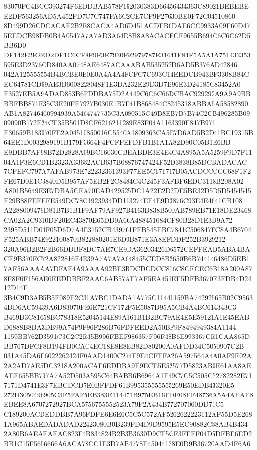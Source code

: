 \documentclass[UTF8,fontset=fandol,zihao=-4,a4paper]{ctexart}
\begin{document}
{{83070FC4BCC393274F6EDDBAB578F162030383D66456434363C89021BEBEBEE2DF563256AD5A452FD7C7C747FA6C2CE7CF9F27630BE0F72C04510860
8D499D26CDCACAE2B2E8CACA4AD6D451ACDFB6DAE6CC9933A09F60D475EEDCB98DB0B4A0547A7A7AD3A64D8B8A8ACACECE9655B694C6C6C62D5BB6D0
DF142E2E2ED2DF1C6CF8F9F3E7930F92979787E31641F84F5A5A1A751433353595E3D2376CD840AA0748AE6487ACAAABAB535252D6AD5B376AD42846
042A125555554B4BCBE0E0E0A4A4A4FCFC7C693C14EEDCB943BF3308B84CEC64781CD69AE3B6008228048F1E3DA232E29D3D7B96E3D24185C83452A0
F3527EB5A9ADAD853B6FDDBA75D2A449C6C6C66DCBAC929292A9A9A9BBBBFBB871E35C3E20FE7927B030E1B7F41B868484C8245318ABBA5A58582890
AB1A82746460994939A5464747735C3A080515C49B8EB7B7B74C2CB496285B0909090B172E24CF35B501D8CF6216211289E83F04A1163390F847B971
E30659B183070FE2A04510850016C5540A1809363CA5E7D6AD5B2D41BC19315B64EE1D0032989191B179F3664F4FCFFEFDFB1B1A1A82D90C05B1E6BB
E9DBB7AF98B72D2828A09BC16030CBEABDE3E4E4C4A895A5A5259F9D7F1104A1F3E6CD1B2323A33682ACB637B08876747424F52D3838B85DCBADACAC
7CFEFC797A7AFAB973E722232361393F77EE5C171717B05ACDCCCCC68F1F2FE67D0E1C3840D5B957AF5EB2F2C8484C4C245F3AFBF6EDC3118B208A02
A801B5649E3E7DBA5CEA70EAD429525DC1A22E2D2DE5BE32D5D5D5454545E29B88FEFEFE549DC78C1923934DD113274EF4E9D3876C93E4E4641CB108
A2288009479D81B7B1B1F9AF79AF927B4163B838B500AB789EB71E18DE23468CA02A2C9310DF20EC43870E65DD0A66A488451084CF80B28D1E3D9A72
2395D511D04F05D6D7A4E3152CB439761FFB545EBC7841C506847FC8A4B6704F525ABB74E922100870B822880201E6D0B871E3A8EFDDF252B3929212
320A96B2B2F2B66DDBF8DC7AE7CE9DA36203426D6572CEFFEAD5ABA4BACE9B370FC72A822816F4E39A7A7A7A648455CED8B2650B6B744146486D5EB1
7AF56AAAAA7DFAF4A9AAAA92BE3BDCDCDCC876C8CECEC6B18A200A878F8F0F156AE0EEDDBBF2AAC6AB57AF7AF5EA451EF5DFB3670F3FDB4D2412D14F
3B4C9D3AB5B5F089E2C31A7BC1DADA1A775C11441159BA74292565B02C95634DD6AC59439A6D83070FE6E721CF172F5E5087D95A5CB4A4BC614343C3
B469D3C81658BC78318E52045144E89A161B1B2BC79AE4E5E59121A1E45EABD6888B8BA3DB99A74F9F96F286B76FDFEED2A50BF9F8494949384A1144
1159BB762D3591C3C2C2E45B996FBEF986357F96F48B6E993367CE1CAA865DBB767DFCF8B194FB0CAC4EC18E8E8EB82D80200A0AFDD34C5050907C2B
031A45DA6F6022262424F0AAD1400C274F9E4CFFFA26A597564A4A0AF9E02A2A2AD7AE5DC3218A200ACAF6EDDBA9E9ECE5E52577D5823AB0E61AA8AE
AEE655BB797A7A52D503A595C64BABB6B6964A1F49C7C5C505C72782282E717171D4741E3F7EBCDCD7E0BFFDF61B995355555555269E50EDB43320E5
272D3050496905C3F5FAF5EB383E114471B975EB16FDF08FF48736A5A4AEAE8EBEE8A6707272927BCA5756755552523A79F2A434B772707060DD71C5
C189200ACDEDDBB7A96FDFE6E6E6C5C5C572AF5262622223112AF55D5E2681A965ABAEDADADAD22423080B0B239FD4D9D9595E5EC90882C88AB4B434
2A80B6AEAEAEAC823F4B834824B2B3B3630D9CF5CF3FFFF04D5DFBF6ED2BB1C15F5656666A6ACA78CC1E3D7AB4778E45044138E0D9B36720AAD4F6A6
}}
\end{document}
